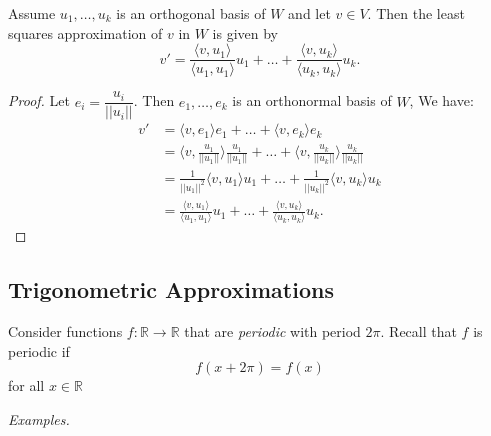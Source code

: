 \documentclass[11pt]{article}
\begin{document}
    Assume \(u_1, \dots, u_k\) is an orthogonal basis of $W$ and let \(v \in V\). Then the least squares approximation of $v$ in $W$ is given by \[v' = \frac{\langle v, u_1 \rangle}{\langle u_1, u_1 \rangle} u_1 + \dots + \frac{\langle v, u_k \rangle}{\langle u_k, u_k \rangle} u_k.\]

    \begin{proof}
        Let \(e_i = \dfrac{u_i}{||u_i||}\). Then \(e_1, \dots, e_k\) is an orthonormal basis of $W$, We have:
        \begin{align*}
            v' &= \langle v, e_1 \rangle e_1 + \dots + \langle v, e_k \rangle e_k \\
               &= \bigg\langle v, \frac{u_1}{||u_1||} \bigg\rangle \frac{u_1}{||u_1||} + \dots + \bigg\langle v, \frac{u_k}{||u_k||} \bigg\rangle \frac{u_k}{||u_k||} \\
               &= \frac{1}{||u_1||^2} \langle v, u_1 \rangle u_1 + \dots + \frac{1}{||u_k||^2} \langle v, u_k \rangle u_k \\
               &= \frac{\langle v, u_1 \rangle}{\langle u_1, u_1 \rangle} u_1 + \dots + \frac{\langle v, u_k \rangle}{\langle u_k, u_k \rangle} u_k.
        \end{align*}
    \end{proof}

    \subsection{Trigonometric Approximations}

    Consider functions \(f:\mathbb{R} \rightarrow \mathbb{R}\) that are \emph{periodic} with period \(2 \pi\). Recall that $f$ is periodic if \[f(x + 2 \pi) = f(x)\] for all \(x \in \mathbb{R}\)

    \vspace{1em}

    \emph{Examples.}
\end{document}
